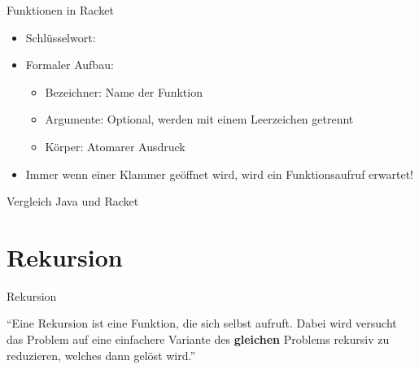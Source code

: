 \documentclass{../tuda-beamer}
\begin{document}
    \begin{frame}{Funktionen in Racket}
        \begin{itemize}
            \item Schlüsselwort: 
            \item Formaler Aufbau:
            \begin{center}
            \end{center}
            \begin{itemize}
                \item Bezeichner: Name der Funktion
                \item Argumente: Optional, werden mit einem Leerzeichen getrennt
                \item Körper: Atomarer Ausdruck
            \end{itemize}
            \item Immer wenn einer Klammer geöffnet wird, wird ein Funktionsaufruf erwartet!
        \end{itemize}
    \end{frame}

    \begin{frame}{Vergleich Java und Racket}
        \begin{minipage}[t]{.5\linewidth}
            
        \end{minipage}
        \hfill
        \begin{minipage}[t]{.475\linewidth}
            
        \end{minipage}
    \end{frame}


    \section{Rekursion}
    \begin{frame}[c]{Rekursion}
        \begin{center}
            \enquote{Eine Rekursion ist eine Funktion, die sich selbst aufruft. Dabei wird versucht
            das Problem auf eine einfachere Variante des \textbf{gleichen} Problems rekursiv zu
            reduzieren, welches dann gelöst wird.}
        \end{center}
    \end{frame}
\end{document}
